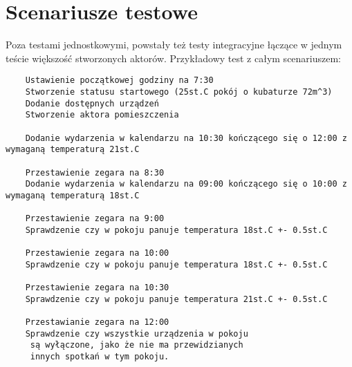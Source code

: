 \section{Scenariusze testowe}
Poza testami jednostkowymi, powstały też testy integracyjne łączące w jednym teście większość stworzonych aktorów. Przykładowy test z całym scenariuszem:
\begin{lstlisting}
    Ustawienie początkowej godziny na 7:30
    Stworzenie statusu startowego (25st.C pokój o kubaturze 72m^3)
    Dodanie dostępnych urządzeń
    Stworzenie aktora pomieszczenia

    Dodanie wydarzenia w kalendarzu na 10:30 kończącego się o 12:00 z wymaganą temperaturą 21st.C
    
    Przestawienie zegara na 8:30 
    Dodanie wydarzenia w kalendarzu na 09:00 kończącego się o 10:00 z wymaganą temperaturą 18st.C

    Przestawienie zegara na 9:00
    Sprawdzenie czy w pokoju panuje temperatura 18st.C +- 0.5st.C
    
    Przestawienie zegara na 10:00
    Sprawdzenie czy w pokoju panuje temperatura 18st.C +- 0.5st.C
    
    Przestawienie zegara na 10:30 
    Sprawdzenie czy w pokoju panuje temperatura 21st.C +- 0.5st.C

    Przestawianie zegara na 12:00
    Sprawdzenie czy wszystkie urządzenia w pokoju
     są wyłączone, jako że nie ma przewidzianych 
     innych spotkań w tym pokoju.
\end{lstlisting}